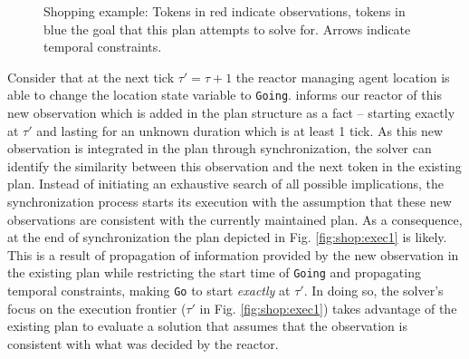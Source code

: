 \begin{figure}[!htb]
  \centering
    \caption{\small Shopping example: Tokens in red indicate
      observations, tokens in blue the goal that this plan attempts to
      solve for. Arrows indicate temporal constraints. }
  \label{fig:shop:exec}
\end{figure}

Consider that at the next tick $\tau' = \tau+1$ the reactor managing
agent location is able to change the location state variable to
\texttt{Going}. \rx informs our reactor of this new observation which
is added in the plan structure as a fact -- starting exactly at
$\tau'$ and lasting for an unknown duration which is at least 1
tick. As this new observation is integrated in the plan through
synchronization, the solver can identify the similarity between this
observation and the next token in the existing plan. Instead of
initiating an exhaustive search of all possible implications, the
synchronization process starts its execution with the assumption that
these new observations are consistent with the currently maintained
plan. As a consequence, at the end of synchronization the plan
depicted in Fig. \ref{fig:shop:exec1} is likely. This is a result of
propagation of information provided by the new observation in the
existing plan while restricting the start time of \texttt{Going} and
propagating temporal constraints, making \texttt{Go} to start {\em
  exactly} at $\tau'$. In doing so, the \eu solver's focus on the
execution frontier ($\tau'$ in Fig. \ref{fig:shop:exec1}) takes
advantage of the existing plan to evaluate a solution that assumes
that the observation is consistent with what was decided by the
reactor.


